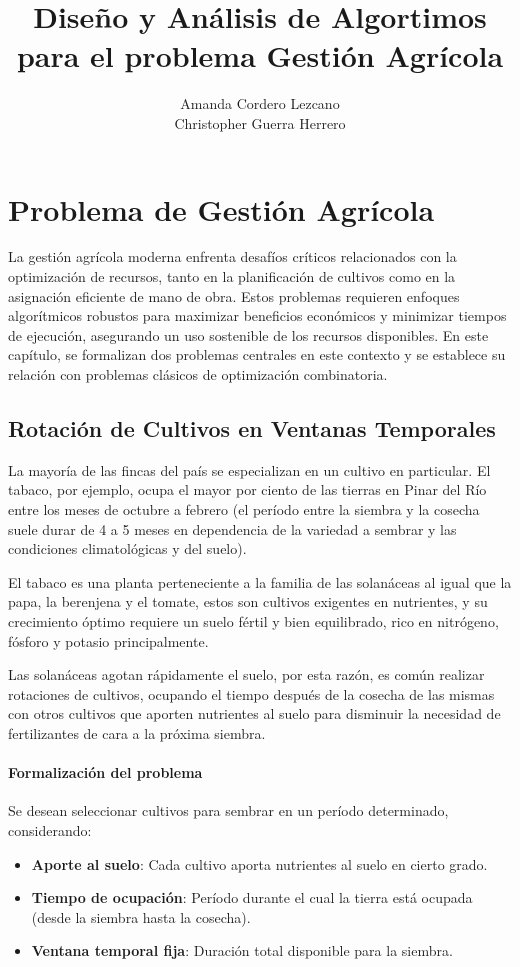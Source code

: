 \documentclass{report}
\title{Diseño y Análisis de Algortimos para el problema Gestión Agrícola}
\author{Amanda Cordero Lezcano\\Christopher Guerra Herrero}
\date{}
\begin{document}
	
	\maketitle
	\tableofcontents
	
	\chapter{Problema de Gestión Agrícola}
	
	
	La gestión agrícola moderna enfrenta desafíos críticos relacionados con la optimización de recursos, tanto en la planificación de cultivos como en la asignación eficiente de mano de obra. Estos problemas requieren enfoques algorítmicos robustos para maximizar beneficios económicos y minimizar tiempos de ejecución, asegurando un uso sostenible de los recursos disponibles. En este capítulo, se formalizan dos problemas centrales en este contexto y se establece su relación con problemas clásicos de optimización combinatoria.

	\section{Rotación de Cultivos en Ventanas Temporales}
	La mayoría de las fincas del país se especializan en un cultivo en particular. El tabaco, por ejemplo, ocupa el mayor por ciento de las tierras en Pinar del Río entre los meses de octubre a febrero (el período entre la siembra y la cosecha suele durar de 4 a 5 meses en dependencia de la variedad a sembrar y las condiciones climatológicas y del suelo).
	
	 El tabaco es una planta perteneciente a la familia de las solanáceas al igual que la papa, la berenjena y el tomate, estos son cultivos exigentes en nutrientes, y su crecimiento óptimo requiere un suelo fértil y bien equilibrado, rico en nitrógeno, fósforo y potasio principalmente. 
	 
	 Las solanáceas agotan rápidamente el suelo, por esta razón, es común realizar rotaciones de cultivos, ocupando el tiempo después de la cosecha de las mismas con otros cultivos que aporten nutrientes al suelo para disminuir la necesidad de fertilizantes de cara a la próxima siembra.
	 
	\subsubsection{Formalización del problema}
	Se desean seleccionar cultivos para sembrar en un período determinado, considerando:
	\begin{itemize}
		\item \textbf{Aporte al suelo}: Cada cultivo aporta nutrientes al suelo en cierto grado.
		\item \textbf{Tiempo de ocupación}: Período durante el cual la tierra está ocupada (desde la siembra hasta la cosecha).
		\item \textbf{Ventana temporal fija}: Duración total disponible para la siembra.
	\end{itemize}
	
\end{document}
